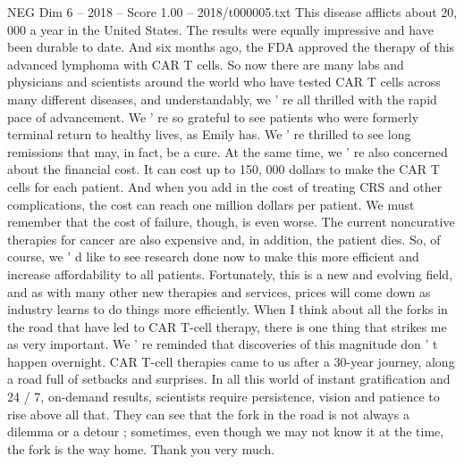 \begin{textsample}{NEG Dim 6 – 2018 – Score 1.00 – 2018/t000005.txt}
This disease afflicts about 20, 000 a year in the United States.
The results were equally impressive and have been durable to date.
And six months ago, the FDA approved the therapy of this advanced lymphoma with CAR T cells.
So now there are many labs and physicians and scientists around the world who have tested CAR T cells across many different diseases, and understandably, we ' re all thrilled with the rapid pace of advancement.
We ' re so grateful to see patients who were formerly terminal return to healthy lives, as Emily has.
We ' re thrilled to see long remissions that may, in fact, be a cure.
At the same time, we ' re also concerned about the financial cost.
It can cost up to 150, 000 dollars to make the CAR T cells for each patient.
And when you add in the cost of treating CRS and other complications, the cost can reach one million dollars per patient.
We must remember that the cost of failure, though, is even worse.
The current noncurative therapies for cancer are also expensive and, in addition, the patient dies.
So, of course, we ' d like to see research done now to make this more efficient and increase affordability to all patients.
Fortunately, this is a new and evolving field, and as with many other new therapies and services, prices will come down as industry learns to do things more efficiently.
When I think about all the forks in the road that have led to CAR T-cell therapy, there is one thing that strikes me as very important.
We ' re reminded that discoveries of this magnitude don ' t happen overnight.
CAR T-cell therapies came to us after a 30-year journey, along a road full of setbacks and surprises.
In all this world of instant gratification and 24 / 7, on-demand results, scientists require persistence, vision and patience to rise above all that.
They can see that the fork in the road is not always a dilemma or a detour ; sometimes, even though we may not know it at the time, the fork is the way home.
Thank you very much.

\end{textsample}
